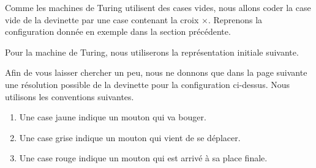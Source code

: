 Comme les machines de Turing utilisent des cases vides, nous allons coder la case vide de la devinette par une case contenant la croix $\times$.
Reprenons la configuration donnée en exemple dans la section précédente. 

\begin{center}
	\boxedB\boxedB\boxedB%
	\emptybox%
	\boxedW\boxedW%
\end{center}

Pour la machine de Turing, nous utiliserons la représentation initiale suivante.

\begin{center}
\emptybox\emptybox%
	\boxedB\boxedB\boxedB%
	\boxit{$\times$}%
	\boxedW\boxedW%
\emptybox\emptybox
\end{center}


Afin de vous laisser chercher un peu, nous ne donnons que dans la page suivante une résolution possible de la devinette pour la configuration ci-dessus. Nous utilisons les conventions suivantes.

\begin{enumerate}
	\item Une case jaune indique un mouton qui va bouger.

	\item Une case grise indique un mouton qui vient de se déplacer.

	\item Une case rouge indique un mouton qui est arrivé à sa place finale.
\end{enumerate}



\newpage

